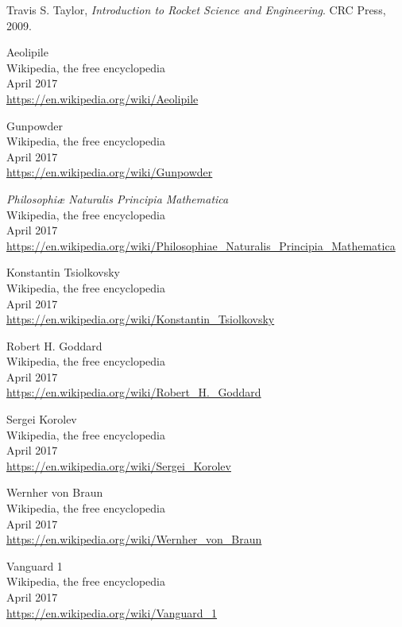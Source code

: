 \documentclass{article}
\begin{document}
\begin{thebibliography}{99}

	Travis S. Taylor,
	\emph{Introduction to Rocket Science and Engineering}.
	CRC Press,
	2009.
	
	Aeolipile\\
	Wikipedia, the free encyclopedia\\
	April 2017\\
	\url{https://en.wikipedia.org/wiki/Aeolipile}
	
	Gunpowder\\
	Wikipedia, the free encyclopedia\\
	April 2017\\
	\url{https://en.wikipedia.org/wiki/Gunpowder}

	\textit{Philosophiæ Naturalis Principia Mathematica}\\
	Wikipedia, the free encyclopedia\\
	April 2017\\
	\url{https://en.wikipedia.org/wiki/Philosophiae_Naturalis_Principia_Mathematica}
	
	Konstantin Tsiolkovsky\\
	Wikipedia, the free encyclopedia\\
	April 2017\\
	\url{https://en.wikipedia.org/wiki/Konstantin_Tsiolkovsky}
	
	Robert H. Goddard\\
	Wikipedia, the free encyclopedia\\
	April 2017\\
	\url{https://en.wikipedia.org/wiki/Robert_H._Goddard}	
	
	Sergei Korolev\\
	Wikipedia, the free encyclopedia\\
	April 2017\\
	\url{https://en.wikipedia.org/wiki/Sergei_Korolev}	

	Wernher von Braun\\
	Wikipedia, the free encyclopedia\\
	April 2017\\
	\url{https://en.wikipedia.org/wiki/Wernher_von_Braun}

	Vanguard 1\\
	Wikipedia, the free encyclopedia\\
	April 2017\\
	\url{https://en.wikipedia.org/wiki/Vanguard_1}
	

\end{thebibliography}
\end{document}
